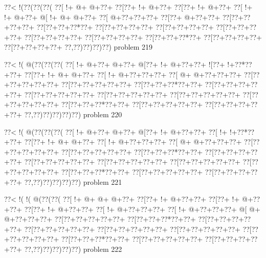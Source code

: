 \vbox{\vbox{\goo
\0??<\- !(\0??(\0??(\0??(
\0??[\- !+\- @+\- @+\0??+
\0??[\0??+\- !+\- @+\0??+
\0??[\0??+\- !+\- @+\0??+
\0??[\- !+\- !+\- @+\0??+
\- @[\- !+\- @+\- @+\0??+
\0??[\- @+\0??+\0??+\0??+
\0??[\0??+\- @+\0??+\0??+
\0??[\0??+\0??+\0??+\0??+
\0??[\0??+\0??+\0??*\0??+
\0??[\0??+\0??+\0??+\0??+
\0??[\0??+\0??+\0??+\0??+
\0??[\0??+\0??+\0??+\0??+
\0??[\0??+\0??+\0??+\0??+
\0??[\0??+\0??+\0??+\0??+
\0??[\0??+\0??+\0??*\0??+
\0??[\0??+\0??+\0??+\0??+
\0??[\0??+\0??+\0??+\0??+
\0??,\0??)\0??)\0??)\0??)
}
\hfil problem 219\hfil\break
}

\vbox{\vbox{\goo
\0??<\- !(\- @(\0??(\0??(\0??(
\0??[\- !+\- @+\0??+\- @+\0??+
\- @[\0??+\- !+\- @+\0??+\0??+
\- ![\0??+\- !+\0??*\0??+\0??+
\0??[\0??+\- !+\- @+\- @+\0??+
\0??[\- !+\- @+\0??+\0??+\0??+
\0??[\- @+\- @+\0??+\0??+\0??+
\0??[\0??+\0??+\0??+\0??+\0??+
\0??[\0??+\0??+\0??+\0??+\0??+
\0??[\0??+\0??+\0??*\0??+\0??+
\0??[\0??+\0??+\0??+\0??+\0??+
\0??[\0??+\0??+\0??+\0??+\0??+
\0??[\0??+\0??+\0??+\0??+\0??+
\0??[\0??+\0??+\0??+\0??+\0??+
\0??[\0??+\0??+\0??+\0??+\0??+
\0??[\0??+\0??+\0??*\0??+\0??+
\0??[\0??+\0??+\0??+\0??+\0??+
\0??[\0??+\0??+\0??+\0??+\0??+
\0??,\0??)\0??)\0??)\0??)\0??)
}
\hfil problem 220\hfil\break
}

\vbox{\vbox{\goo
\0??<\- !(\- @(\0??(\0??(\0??(
\0??[\- !+\- @+\0??+\- @+\0??+
\- @[\0??+\- !+\- @+\0??+\0??+
\0??[\- !+\- !+\0??*\0??+\0??+
\0??[\0??+\- !+\- @+\- @+\0??+
\0??[\- !+\- @+\0??+\0??+\0??+
\0??[\- @+\- @+\0??+\0??+\0??+
\0??[\0??+\0??+\0??+\0??+\0??+
\0??[\0??+\0??+\0??+\0??+\0??+
\0??[\0??+\0??+\0??*\0??+\0??+
\0??[\0??+\0??+\0??+\0??+\0??+
\0??[\0??+\0??+\0??+\0??+\0??+
\0??[\0??+\0??+\0??+\0??+\0??+
\0??[\0??+\0??+\0??+\0??+\0??+
\0??[\0??+\0??+\0??+\0??+\0??+
\0??[\0??+\0??+\0??*\0??+\0??+
\0??[\0??+\0??+\0??+\0??+\0??+
\0??[\0??+\0??+\0??+\0??+\0??+
\0??,\0??)\0??)\0??)\0??)\0??)
}
\hfil problem 221\hfil\break
}

\vbox{\vbox{\goo
\0??<\- !(\- !(\- @(\0??(\0??(
\0??[\- !+\- @+\- @+\- @+\0??+
\0??[\0??+\- !+\- @+\0??+\0??+
\0??[\0??+\- !+\- @+\0??+\0??+
\0??[\0??+\- !+\- @+\0??+\0??+
\0??[\- !+\- @+\0??+\0??+\0??+
\0??[\- !+\- @+\0??+\0??+\0??+
\- @[\- @+\- @+\0??+\0??+\0??+
\0??[\0??+\0??+\0??+\0??+\0??+
\0??[\0??+\0??+\0??*\0??+\0??+
\0??[\0??+\0??+\0??+\0??+\0??+
\0??[\0??+\0??+\0??+\0??+\0??+
\0??[\0??+\0??+\0??+\0??+\0??+
\0??[\0??+\0??+\0??+\0??+\0??+
\0??[\0??+\0??+\0??+\0??+\0??+
\0??[\0??+\0??+\0??*\0??+\0??+
\0??[\0??+\0??+\0??+\0??+\0??+
\0??[\0??+\0??+\0??+\0??+\0??+
\0??,\0??)\0??)\0??)\0??)\0??)
}
\hfil problem 222\hfil\break
}

